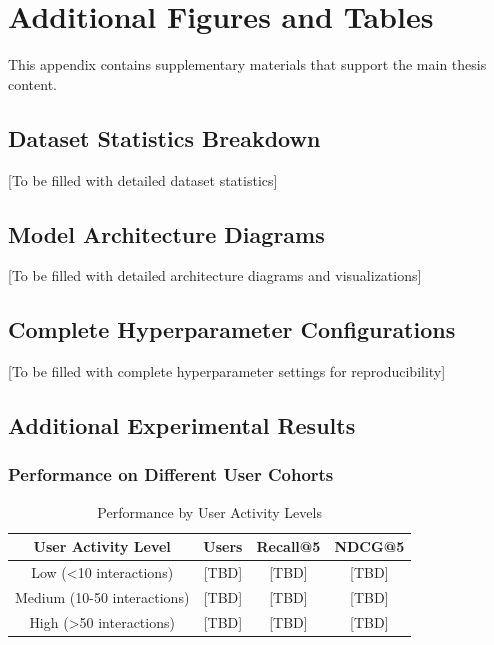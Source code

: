 
\appendix

\section{Additional Figures and Tables}

This appendix contains supplementary materials that support the main thesis content.

\subsection{Dataset Statistics Breakdown}

[To be filled with detailed dataset statistics]

\subsection{Model Architecture Diagrams}

[To be filled with detailed architecture diagrams and visualizations]

\subsection{Complete Hyperparameter Configurations}

[To be filled with complete hyperparameter settings for reproducibility]

\subsection{Additional Experimental Results}

\subsubsection{Performance on Different User Cohorts}

\begin{table}[htbp]
    \centering
    \caption{Performance by User Activity Levels}
    \label{tab:cohort_performance}
    \begin{tabular}{|c|c|c|c|}
        \hline
        \textbf{User Activity Level} & \textbf{Users} & \textbf{Recall@5} & \textbf{NDCG@5} \\
        \hline
        Low (<10 interactions) & [TBD] & [TBD] & [TBD] \\
        \hline
        Medium (10-50 interactions) & [TBD] & [TBD] & [TBD] \\
        \hline
        High (>50 interactions) & [TBD] & [TBD] & [TBD] \\
        \hline
    \end{tabular}
\end{table}

